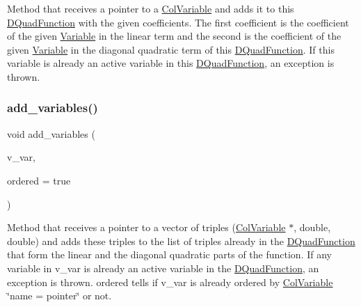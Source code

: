 Method that receives a pointer to a \mbox{\hyperlink{class_s_m_spp__di__unipi__it_1_1_col_variable}{Col\+Variable}} and adds it to this \mbox{\hyperlink{class_s_m_spp__di__unipi__it_1_1_d_quad_function}{D\+Quad\+Function}} with the given coefficients. The first coefficient is the coefficient of the given \mbox{\hyperlink{class_s_m_spp__di__unipi__it_1_1_variable}{Variable}} in the linear term and the second is the coefficient of the given \mbox{\hyperlink{class_s_m_spp__di__unipi__it_1_1_variable}{Variable}} in the diagonal quadratic term of this \mbox{\hyperlink{class_s_m_spp__di__unipi__it_1_1_d_quad_function}{D\+Quad\+Function}}. If this variable is already an active variable in this \mbox{\hyperlink{class_s_m_spp__di__unipi__it_1_1_d_quad_function}{D\+Quad\+Function}}, an exception is thrown. \mbox{\label{class_s_m_spp__di__unipi__it_1_1_d_quad_function_ae6b094640d919cd6f2f9c226aa32417d}} 
\subsubsection{\texorpdfstring{add\+\_\+variables()}{add\_variables()}}
{\footnotesize\ttfamily void add\+\_\+variables (\begin{DoxyParamCaption}\item[{\mbox{\hyperlink{class_s_m_spp__di__unipi__it_1_1_d_quad_function_adaced695e00a65836eb558a7bfbd85f4}{v\+\_\+var\+\_\+coeff\+\_\+coeff\+\_\+triple}} $\ast$}]{v\+\_\+var,  }\item[{const bool}]{ordered = {\ttfamily true} }\end{DoxyParamCaption})}

Method that receives a pointer to a vector of triples (\mbox{\hyperlink{class_s_m_spp__di__unipi__it_1_1_col_variable}{Col\+Variable}} $\ast$, double, double) and adds these triples to the list of triples already in the \mbox{\hyperlink{class_s_m_spp__di__unipi__it_1_1_d_quad_function}{D\+Quad\+Function}} that form the linear and the diagonal quadratic parts of the function. If any variable in v\+\_\+var is already an active variable in the \mbox{\hyperlink{class_s_m_spp__di__unipi__it_1_1_d_quad_function}{D\+Quad\+Function}}, an exception is thrown. ordered tells if v\+\_\+var is already ordered by \mbox{\hyperlink{class_s_m_spp__di__unipi__it_1_1_col_variable}{Col\+Variable}} \char`\"{}name = pointer\char`\"{} or not.

